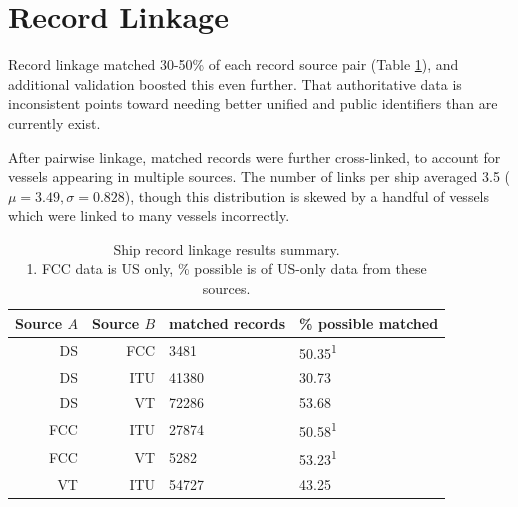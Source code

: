 


\section{Record Linkage}

Record linkage matched 30-50\% of each record source pair (Table \ref{table:ships-record-linkage-results-summary}), and additional validation boosted this even further. That authoritative data is inconsistent points toward needing better unified and public identifiers than are currently exist.

After pairwise linkage, matched records were further cross-linked, %
 to account for vessels appearing in multiple sources. The number of links per ship averaged 3.5 ($\mu = 3.49, \sigma = 0.828$), %
though this distribution is skewed by a handful of vessels which were linked to many vessels incorrectly. 
\begin{table}[htbp]
  \begin{tabular}{rrll} %
    \hline
    Source $A$ & Source $B$ & matched records & \% possible matched \\
    \hline
     DS & FCC &  3481 & 50.35\textsuperscript{1} \\
     DS & ITU & 41380 & 30.73 \\
     DS &  VT & 72286 & 53.68 \\
    FCC & ITU & 27874 & 50.58\textsuperscript{1} \\
    FCC &  VT &  5282 & 53.23\textsuperscript{1} \\
     VT & ITU & 54727 & 43.25 \\
  \end{tabular}
  \caption{Ship record linkage results summary. \\
    1. FCC data is US only, \% possible is of US-only data from these sources.}
  \label{table:ships-record-linkage-results-summary}
\end{table}

